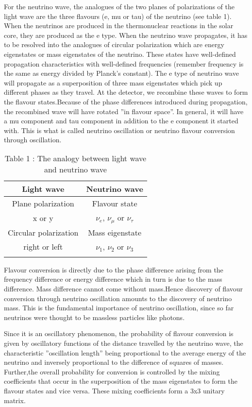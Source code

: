 For the neutrino wave, the analogues of the two planes of polarizations
of the light wave are the three flavours (e, mu or tau) of the neutrino (see
table 1). When the neutrinos are produced in the thermonuclear reactions
in the solar core, they are produced as the e type. When the neutrino wave
propagates, it has to be resolved into the analogues of circular polarization
which are energy eigenstates or mass eigenstates of the neutrino. These states
have well-defined propagation characteristics with well-defined frequencies (remember frequency is the same as energy divided by Planck’s constant).
The e type of neutrino wave will propagate as a superposition of three mass
eigenstates which pick up different phases as they travel. At the detector,
we recombine these waves to form the flavour states.Because of the phase
differences introduced during propagation, the recombined wave will have
rotated ”in flavour space”. In general, it will have a mu component and tau
component in addition to the e component it started with. This is what is
called neutrino oscillation or neutrino flavour conversion through oscillation.
\begin{longtable}{cc}
\hline
Light wave & Neutrino wave \\
\hline
Plane polarization & Flavour state\\
x or y & $\nu_{e}$, $\nu_{\mu}$ or $\nu_{\tau}$\\
\hline
Circular polarization & Mass eigenstate\\
right or left & $\nu_{1}$, $\nu_{2}$ or $\nu_{3}$\\
\hline
\caption*{Table 1 : The analogy between light wave and neutrino wave}
\end{longtable}

\newpage

Flavour conversion is directly due to the phase difference arising from the
frequency difference or energy difference which in turn is due to the mass
difference. Mass difference cannot come without mass.Hence discovery of
flavour conversion through neutrino oscillation amounts to the discovery of
neutrino mass. This is the fundamental importance of neutrino oscillation,
since so far neutrinos were thought to be massless particles like photons.

Since it is an oscillatory phenomenon, the probability of flavour conversion
is given by oscillatory functions of the distance travelled by the neutrino
wave, the characteristic ”oscillation length” being proportional to the average
energy of the neutrino and inversely proportional to the difference of squares
of masses. Further,the overall probability for conversion is controlled by the
mixing coefficients that occur in the superposition of the mass eigenstates to
form the flavour states and vice versa. These mixing coefficients form a 3x3
unitary matrix.

